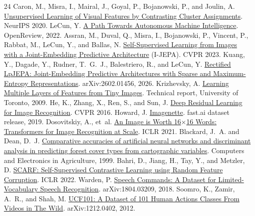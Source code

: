 \documentclass[11pt]{article}
\begin{document}
\begin{thebibliography}{24}
 Caron, M., Misra, I., Mairal, J., Goyal, P., Bojanowski, P., and Joulin, A. \href{https://arxiv.org/abs/2006.09882}{Unsupervised Learning of Visual Features by Contrasting Cluster Assignments}. NeurIPS 2020.
 LeCun, Y. \href{https://openreview.net/forum?id=BZ5a1r-kVsf}{A Path Towards Autonomous Machine Intelligence}. OpenReview, 2022.
 Assran, M., Duval, Q., Misra, I., Bojanowski, P., Vincent, P., Rabbat, M., LeCun, Y., and Ballas, N. \href{https://arxiv.org/abs/2301.08243}{Self-Supervised Learning from Images with a Joint-Embedding Predictive Architecture} (I-JEPA). CVPR 2023.
 Kuang, Y., Dagade, Y., Rudner, T.~G.~J., Balestriero, R., and LeCun, Y. \href{https://arxiv.org/abs/2602.01456}{Rectified LpJEPA: Joint-Embedding Predictive Architectures with Sparse and Maximum-Entropy Representations}. arXiv:2602.01456, 2026.
 Krizhevsky, A. \href{https://www.cs.toronto.edu/~kriz/learning-features-2009-TR.pdf}{Learning Multiple Layers of Features from Tiny Images}. Technical report, University of Toronto, 2009.
 He, K., Zhang, X., Ren, S., and Sun, J. \href{https://arxiv.org/abs/1512.03385}{Deep Residual Learning for Image Recognition}. CVPR 2016.
 Howard, J. \href{https://github.com/fastai/imagenette}{Imagenette}. fast.ai dataset release, 2019.
 Dosovitskiy, A., et~al. \href{https://arxiv.org/abs/2010.11929}{An Image is Worth 16\(\times\)16 Words: Transformers for Image Recognition at Scale}. ICLR 2021.
 Blackard, J.~A. and Dean, D.~J. \href{https://archive.ics.uci.edu/dataset/31/covertype}{Comparative accuracies of artificial neural networks and discriminant analysis in predicting forest cover types from cartographic variables}. Computers and Electronics in Agriculture, 1999.
 Bahri, D., Jiang, H., Tay, Y., and Metzler, D. \href{https://arxiv.org/abs/2106.15147}{SCARF: Self-Supervised Contrastive Learning using Random Feature Corruption}. ICLR 2022.
 Warden, P. \href{https://arxiv.org/abs/1804.03209}{Speech Commands: A Dataset for Limited-Vocabulary Speech Recognition}. arXiv:1804.03209, 2018.
 Soomro, K., Zamir, A.~R., and Shah, M. \href{https://arxiv.org/abs/1212.0402}{UCF101: A Dataset of 101 Human Actions Classes From Videos in The Wild}. arXiv:1212.0402, 2012.
\end{thebibliography}
\end{document}
